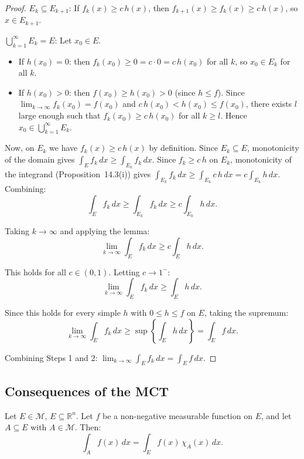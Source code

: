\documentclass[11pt]{report}
\begin{document}
\begin{proof}
\textit{$E_k \subseteq E_{k+1}$}: If $f_k(x) \geq c\,h(x)$, then $f_{k+1}(x) \geq f_k(x) \geq c\,h(x)$, so $x \in E_{k+1}$.

\textit{$\bigcup_{k=1}^{\infty} E_k = E$}: Let $x_0 \in E$.

\begin{itemize}
\item If $h(x_0) = 0$: then $f_k(x_0) \geq 0 = c \cdot 0 = c\,h(x_0)$ for all $k$, so $x_0 \in E_k$ for all $k$.
\item If $h(x_0) > 0$: then $f(x_0) \geq h(x_0) > 0$ (since $h \leq f$). Since $\lim_{k \to \infty} f_k(x_0) = f(x_0)$ and $c\,h(x_0) < h(x_0) \leq f(x_0)$, there exists $l$ large enough such that $f_k(x_0) \geq c\,h(x_0)$ for all $k \geq l$. Hence $x_0 \in \bigcup_{k=1}^{\infty} E_k$.
\end{itemize}

Now, on $E_k$ we have $f_k(x) \geq c\,h(x)$ by definition. Since $E_k \subseteq E$, monotonicity of the domain gives $\int_E f_k\,dx \geq \int_{E_k} f_k\,dx$. Since $f_k \geq c\,h$ on $E_k$, monotonicity of the integrand (Proposition~14.3(i)) gives $\int_{E_k} f_k\,dx \geq \int_{E_k} c\,h\,dx = c\int_{E_k} h\,dx$. Combining:
\[
\int_E f_k\,dx \geq \int_{E_k} f_k\,dx \geq c \int_{E_k} h\,dx.
\]

Taking $k \to \infty$ and applying the lemma:
\[
\lim_{k \to \infty} \int_E f_k\,dx \geq c \int_E h\,dx.
\]

This holds for all $c \in (0, 1)$. Letting $c \to 1^-$:
\[
\lim_{k \to \infty} \int_E f_k\,dx \geq \int_E h\,dx.
\]

Since this holds for every simple $h$ with $0 \leq h \leq f$ on $E$, taking the supremum:
\[
\lim_{k \to \infty} \int_E f_k\,dx \geq \sup\left\{\int_E h\,dx\right\} = \int_E f\,dx.
\]

Combining Steps 1 and 2: $\displaystyle\lim_{k \to \infty} \int_E f_k\,dx = \int_E f\,dx$.
\end{proof}

\subsection{Consequences of the MCT}

\begin{propbox}
Let $E \in \mathcal{M}$, $E \subseteq \mathbb{R}^n$. Let $f$ be a non-negative measurable function on $E$, and let $A \subseteq E$ with $A \in \mathcal{M}$. Then:
\[
\int_A f(x)\,dx = \int_E f(x)\,\chi_A(x)\,dx.
\]
\end{propbox}
\end{document}
